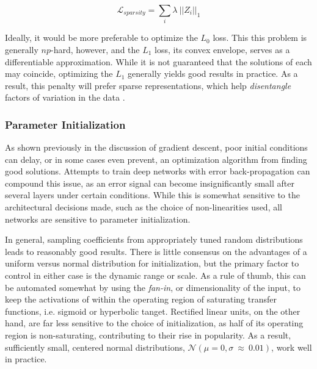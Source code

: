 \begin{equation}
\mathcal{L}_{sparsity}=\sum_i\lambda~||Z_i||_1
\end{equation}

\noindent Ideally, it would be more preferable to optimize the $L_0$ loss.
This this problem is generally $np$-hard, however, and the $L_1$ loss, its convex envelope, serves as a differentiable approximation.
While it is not guaranteed that the solutions of each may coincide, optimizing the $L_1$ generally yields good results in practice.
As a result, this penalty will prefer sparse representations, which help \emph{disentangle} factors of variation in the data \cite{Goodfellow}.


\subsubsection{Parameter Initialization}

As shown previously in the discussion of gradient descent, poor initial conditions can delay, or in some cases even prevent, an optimization algorithm from finding good solutions.
Attempts to train deep networks with error back-propagation can compound this issue, as an error signal can become insignificantly small after several layers under certain conditions.
While this is somewhat sensitive to the architectural decisions made, such as the choice of non-linearities used, all networks are sensitive to parameter initialization.

In general, sampling coefficients from appropriately tuned random distributions leads to reasonably good results.
There is little consensus on the advantages of a uniform versus normal distribution for initialization, but the primary factor to control in either case is the dynamic range or scale.
As a rule of thumb, this can be automated somewhat by using the \emph{fan-in}, or dimensionality of the input, to keep the activations of within the operating region of saturating transfer functions, i.e. sigmoid or hyperbolic tanget.
Rectified linear units, on the other hand, are far less sensitive to the choice of initialization, as half of its operating region is non-saturating, contributing to their rise in popularity.
As a result, sufficiently small, centered normal distributions, $\mathcal{N}(\mu=0, \sigma~\approx~0.01)$, work well in practice.

